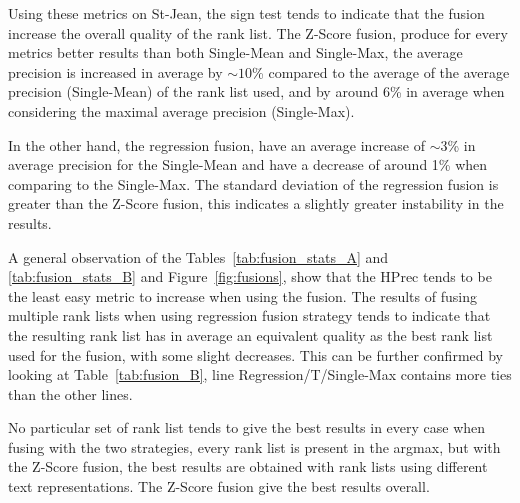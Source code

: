 Using these metrics on St-Jean, the sign test tends to indicate that the fusion increase the overall quality of the rank list.
The Z-Score fusion, produce for every metrics better results than both Single-Mean and Single-Max, the average precision is increased in average by $\sim 10$\% compared to the average of the average precision (Single-Mean) of the rank list used, and by around 6\% in average when considering the maximal average precision (Single-Max).

In the other hand, the regression fusion, have an average increase of $\sim 3$\% in average precision for the Single-Mean and have a decrease of around 1\% when comparing to the Single-Max.
The standard deviation of the regression fusion is greater than the Z-Score fusion, this indicates a slightly greater instability in the results.

A general observation of the Tables~\ref{tab:fusion_stats_A} and \ref{tab:fusion_stats_B} and Figure~\ref{fig:fusions}, show that the HPrec tends to be the least easy metric to increase when using the fusion.
The results of fusing multiple rank lists when using regression fusion strategy tends to indicate that the resulting rank list has in average an equivalent quality as the best rank list used for the fusion, with some slight decreases.
This can be further confirmed by looking at Table~\ref{tab:fusion_B}, line Regression/T/Single-Max contains more ties than the other lines.

No particular set of rank list tends to give the best results in every case when fusing with the two strategies, every rank list is present in the argmax, but with the Z-Score fusion, the best results are obtained with rank lists using different text representations.
The Z-Score fusion give the best results overall.

